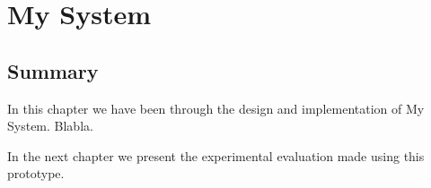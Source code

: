 \chapter{My System}
\label{sec:mywork}
 
 
 \section*{Summary}

In this chapter we have been through the design and implementation of
My System. Blabla.

In the next chapter we present the experimental evaluation made using this prototype.
 
